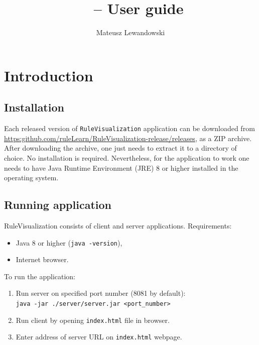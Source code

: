\documentclass[12pt]{article}
\title{\appname \ \appversion \ -- User guide}
\author{Mateusz Lewandowski}
\begin{document}
\maketitle
\tableofcontents

\pagebreak

\section{Introduction}

\subsection{Installation}

Each released version of \texttt{RuleVisualization} application can be downloaded from \href{https://github.com/ruleLearn/RuleVisualization-release/releases}{https:github.com/ruleLearn/RuleVisualization-release/releases}, as a ZIP archive. After downloading the archive, one just needs to extract it to a directory of choice. No installation is required. Nevertheless, for the application to work one needs to have Java Runtime Environment (JRE) 8 or higher installed in the operating system.

\subsection{Running application}\label{subsec:server}

RuleVisualization consists of client and server applications. 
Requirements:
\begin{itemize}
    \setlength\itemsep{0em}
    \item Java 8 or higher (\texttt{java -version}),
    \item Internet browser. 
\end{itemize}

To run the application:
\begin{enumerate}
    \setlength\itemsep{0em}
    \item Run server on specified port number (8081 by default):\\
          \texttt{java -jar ./server/server.jar <port\_number> }
    \item Run client by opening \texttt{index.html} file in browser.
    \item Enter address of server URL on \texttt{index.html} webpage.
\end{enumerate}
\end{document}
